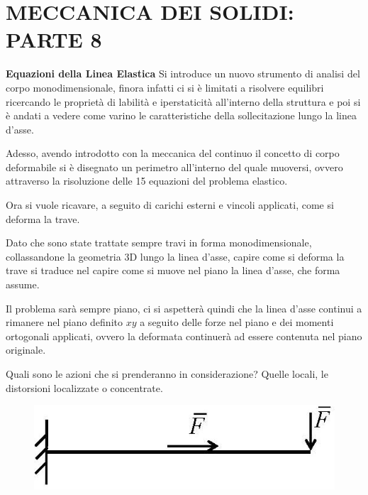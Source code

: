 \documentclass{article}
\begin{document}
	\section*{MECCANICA DEI SOLIDI: PARTE 8} %


\begin{adjustwidth}{2in}{} 
{\Large \textbf{Equazioni della Linea Elastica}} \mbox{} \newline
		Si introduce un nuovo strumento di analisi del corpo monodimensionale, finora infatti ci si è limitati a risolvere equilibri ricercando le proprietà di labilità e iperstaticità all'interno della struttura e poi si è andati a vedere come varino le caratteristiche della sollecitazione lungo la linea d'asse. \newline 
		
		Adesso, avendo introdotto con la meccanica del continuo il concetto di corpo deformabile si è disegnato un perimetro all'interno del quale muoversi, ovvero attraverso la risoluzione delle 15 equazioni del problema elastico. \newline 
		
		Ora si vuole ricavare, a seguito di carichi esterni e vincoli applicati, come si deforma la trave. \newline
		
		Dato che sono state trattate sempre travi in forma monodimensionale, collassandone la geometria 3D lungo la linea d'asse, capire come si deforma la trave si traduce nel capire come si muove nel piano la linea d'asse, che forma assume. \newline
		
		Il problema sarà sempre piano, ci si aspetterà quindi che la linea d'asse continui a rimanere nel piano definito $xy$ a seguito delle forze nel piano e dei momenti ortogonali applicati, ovvero la deformata continuerà ad essere contenuta nel piano originale. \newline 
		
		Quali sono le azioni che si prenderanno in considerazione? Quelle locali, le distorsioni localizzate o concentrate. 

\begin{figure}[H]
	\centering
	\includegraphics[width=0.4\linewidth]{"immagini/1.PARTE8_Pagina_02 (2)"}
\end{figure}
		

\end{adjustwidth}
\end{document}
